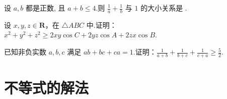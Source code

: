 \documentclass[a4paper , final]{ctexart}
\newenvironment{problem}[1]{%
  \item #1
  \par
  \vspace{8cm}
}{}
\begin{document}
\begin{problems}
  \begin{problem}
  {
  设 $a,b$ 都是正数, 且 $a+b \le 4$.则 $\frac{1}{a} + \frac{1}{b}$ 与 $1$ 的大小关系是 \underline{\hspace{3cm}}.
  }
  \end{problem}

  \begin{problem}
  {
  设 $x, y, z \in \mathbf{R}$，在 $\triangle ABC$ 中.证明：$x^2 + y^2 + z^2 \ge 2xy\cos C + 2yz\cos A + 2zx\cos B$.
  }
  \end{problem}

  \begin{problem}
  {
  已知非负实数 $a, b, c$ 满足 $ab+bc+ca=1$.证明：$\frac{1}{a+b} + \frac{1}{b+c} + \frac{1}{c+a} \ge \frac{5}{2}$.
  }
  \end{problem}

\end{problems}

\newpage
\section*{不等式的解法}
\end{document}
